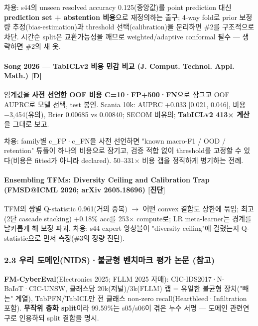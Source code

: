 \par\noindent \textbullet\enspace 차용: s44의 unseen resolved accuracy 0.125(중앙값)를 point prediction 대신 \textbf{prediction set +\allowbreak{} abstention 비용}으로 재정의하는 출구; 4-way fold로 prior 보정량 추정(bias-estimation)과 threshold 선택(calibration)을 분리하면 \#2를 구조적으로 차단. 시간순 split은 교환가능성을 깨므로 weighted/\allowbreak{}adaptive conformal 필수 — 생략하면 \#2의 새 옷.


\paragraph{Song 2026 — TabICLv2 비용 민감 비교 (J. Comput. Technol. Appl. Math.) [D]}
\par\noindent \textbullet\enspace 임계값을 \textbf{사전 선언한 OOF 비용 C=\allowbreak{}10·FP+\allowbreak{}500·FN}으로 잠그고 OOF AUPRC로 모델 선택, test 봉인. Scania 10k: AUPRC +\allowbreak{}0.033 [0.021, 0.046], 비용 −3,454(유의), Brier 0.00685 vs 0.00840; SECOM 비유의; \textbf{TabICLv2 413× 계산}을 그대로 보고.


\par\noindent \textbullet\enspace 차용: family별 c\_\allowbreak{}FP·c\_\allowbreak{}FN을 사전 선언하면 "known macro-F1 /\allowbreak{} OOD /\allowbreak{} retention" 튜플이 하나의 비용으로 잠기고, 검증 적합 없이 threshold를 고정할 수 있다(비용은 fitted가 아니라 declared). 50–331× 비용 갭을 정직하게 병기하는 전례.


\paragraph{Ensembling TFMs: Diversity Ceiling and Calibration Trap (FMSD@ICML 2026; arXiv 2605.18696) [진단]}
\par\noindent \textbullet{} TFM의 쌍별 Q-statistic 0.961(거의 중복)  \ensuremath{\rightarrow}  어떤 convex 결합도 상한에 묶임; 최고(2단 cascade stacking) +\allowbreak{}0.18\% acc를 253× compute로; LR meta-learner는 경계를 날카롭게 해 보정 파괴. 차용: s44 expert 앙상블이 "diversity ceiling"에 걸렸는지 Q-statistic으로 먼저 측정(\#3의 정량 진단).


\subsubsection{2.3 우리 도메인(NIDS)·불균형 벤치마크 평가 논문 (참고)}
\par\noindent \textbullet\enspace \textbf{FM-CyberEval}(Electronics 2025; FLLM 2025 자매): CIC-IDS2017·N-BaIoT·CIC-UNSW, 클래스당 20k(저널)/\allowbreak{}3k(FLLM) 캡 =\allowbreak{} 유일한 불균형 장치("빼는" 계열), TabPFN/\allowbreak{}TabICL만 전 클래스 non-zero recall(Heartbleed·Infiltration 포함). \textbf{무작위 층화 split}이라 99.59\%는 s05/\allowbreak{}s06이 겪은 누수 서명 — 도메인 관련연구로 인용하되 split 결함을 명시.


